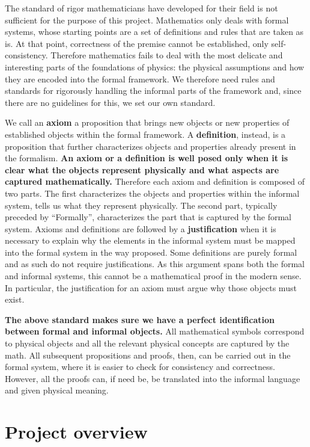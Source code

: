 \documentclass[11pt,letterpaper,fleqn]{memoir} %
\begin{document}
The standard of rigor mathematicians have developed for their field is not sufficient for the purpose of this project. Mathematics only deals with formal systems, whose starting points are a set of definitions and rules that are taken as is. At that point, correctness of the premise cannot be established, only self-consistency. Therefore mathematics fails to deal with the most delicate and interesting parts of the foundations of physics: the physical assumptions and how they are encoded into the formal framework. We therefore need rules and standards for rigorously handling the informal parts of the framework and, since there are no guidelines for this, we set our own standard.

We call an \textbf{axiom} a proposition that brings new objects or new properties of established objects within the formal framework. A \textbf{definition}, instead, is a proposition that further characterizes objects and properties already present in the formalism. \textbf{An axiom or a definition is well posed only when it is clear what the objects represent physically and what aspects are captured mathematically.} Therefore each axiom and definition is composed of two parts. The first characterizes the objects and properties within the informal system, tells us what they represent physically. The second part, typically preceded by ``Formally'', characterizes the part that is captured by the formal system. Axioms and definitions are followed by a \textbf{justification} when it is necessary to explain why the elements in the informal system must be mapped into the formal system in the way proposed. Some definitions are purely formal and as such do not require justifications. As this argument spans both the formal and informal systems, this cannot be a mathematical proof in the modern sense. In particular, the justification for an axiom must argue why those objects must exist.

\textbf{The above standard makes sure we have a perfect identification between formal and informal objects.} All mathematical symbols correspond to physical objects and all the relevant physical concepts are captured by the math. All subsequent propositions and proofs, then, can be carried out in the formal system, where it is easier to check for consistency and correctness. However, all the proofs can, if need be, be translated into the informal language and given physical meaning.

\section{Project overview}
\end{document}
